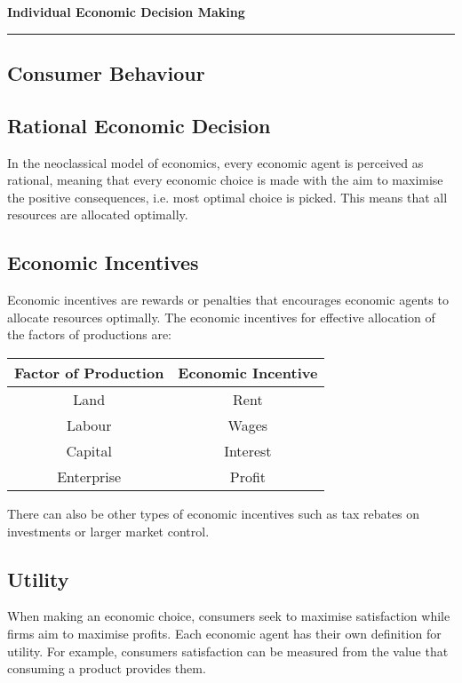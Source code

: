 \documentclass[a4paper,10pt]{article}
\makeatletter
\newenvironment{tablehere}
	{\def\@captype{table}}{}
\makeatother
\begin{document}
{
\LARGE \bfseries Individual Economic Decision Making
\vspace*{16pt} \hrule \vspace*{16pt}
}
\begin{multicols*}{2}
	\tableofcontents

	\section{Consumer Behaviour}
	\subsection{Rational Economic Decision}
	In the neoclassical model of economics, every economic agent is perceived as rational, meaning that every economic choice is made with the aim to maximise the positive consequences, i.e. most optimal choice is picked. This means that all resources are allocated optimally.

	\subsection{Economic Incentives}
	Economic incentives are rewards or penalties that encourages economic agents to allocate resources optimally. The economic incentives for effective allocation of the factors of productions are:

	\begin{center}
		\begin{tablehere}
			\begin{tabular}{|c|c|}
				\hline
				Factor of Production & Economic Incentive \\
				\hline
				Land                 & Rent               \\
				Labour               & Wages              \\
				Capital              & Interest           \\
				Enterprise           & Profit             \\
				\hline
			\end{tabular}
		\end{tablehere}
	\end{center}

	There can also be other types of economic incentives such as tax rebates on investments or larger market control.

	\subsection{Utility}
	When making an economic choice, consumers seek to maximise satisfaction while firms aim to maximise profits. Each economic agent has their own definition for utility. For example, consumers satisfaction can be measured from the value that consuming a product provides them.


\end{multicols*}
\end{document}
